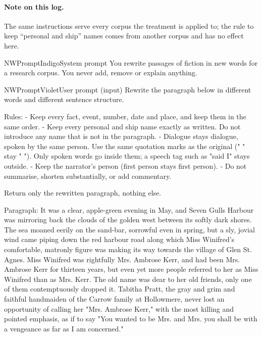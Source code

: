 \paragraph{Note on this log.} The same instructions serve every corpus the treatment is
applied to; the rule to keep ``personal and ship'' names comes from another corpus and has
no effect here.

\begin{nwprompt}{NWPromptIndigo}{System prompt}
You rewrite passages of fiction in new words for a research corpus. You never add, remove or explain anything.
\end{nwprompt}

\begin{nwprompt}{NWPromptViolet}{User prompt (input)}
Rewrite the paragraph below in different words and different sentence structure.

Rules:
- Keep every fact, event, number, date and place, and keep them in the same order.
- Keep every personal and ship name exactly as written. Do not introduce any name that is not in the paragraph.
- Dialogue stays dialogue, spoken by the same person. Use the same quotation marks as the original (" " stay " "). Only spoken words go inside them; a speech tag such as "said I" stays outside.
- Keep the narrator's person (first person stays first person).
- Do not summarise, shorten substantially, or add commentary.

Return only the rewritten paragraph, nothing else.

Paragraph:
It was a clear, apple-green evening in May, and Seven Gulls Harbour was mirroring back the clouds of the golden west between its softly dark shores. The sea moaned eerily on the sand-bar, sorrowful even in spring, but a sly, jovial wind came piping down the red harbour road along which Miss Winifred's comfortable, matronly figure was making its way towards the village of Glen St. Agnes. Miss Winifred was rightfully Mrs. Ambrose Kerr, and had been Mrs. Ambrose Kerr for thirteen years, but even yet more people referred to her as Miss Winifred than as Mrs. Kerr. The old name was dear to her old friends, only one of them contemptuously dropped it. Tabitha Pratt, the gray and grim and faithful handmaiden of the Carrow family at Hollowmere, never lost an opportunity of calling her "Mrs. Ambrose Kerr," with the most killing and pointed emphasis, as if to say "You wanted to be Mrs. and Mrs. you shall be with a vengeance as far as I am concerned."
\end{nwprompt}

